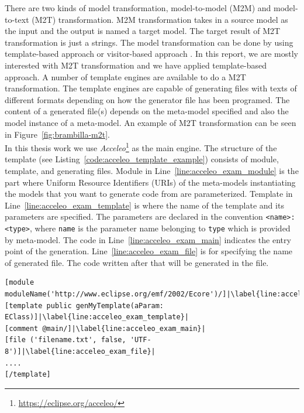 There are two kinds of model transformation, model-to-model (M2M) and model-to-text (M2T) transformation. M2M transformation takes in a source model as the input and the output is named a target model. The target result of M2T transformation is just a strings. The model transformation can be done by using  template-based approach or visitor-based approach \cite{Czarnecki}. In this report, we are mostly interested with M2T transformation and we have applied template-based approach. A number of template engines are available to do a M2T transformation. The template engines are capable of generating files with texts of different formats depending on how the generator file has been programed. The content of a generated file(s) depends on the meta-model specified and also the model instance of a meta-model. An example of M2T transformation can be seen in Figure~\ref{fig:brambilla-m2t}. \\

In this thesis work we use \textit{Acceleo}\footnote{\url{https://eclipse.org/acceleo/}} as the main engine. The structure of the template (see Listing~\ref{code:acceleo_template_example}) consists of module, template, and generating files. Module in Line~\ref{line:acceleo_exam_module} is the part where Uniform Resource Identifiers (URIs) of the meta-models instantiating the models that you want to generate code from are parameterized. Template in Line~\ref{line:acceleo_exam_template} is where the name of the template and its parameters are specified. The parameters are declared in the convention \texttt{<name>:<type>}, where \texttt{name} is the parameter name belonging to \texttt{type} which is provided by meta-model. The code in Line~\ref{line:acceleo_exam_main} indicates the entry point of the generation. Line~\ref{line:acceleo_exam_file} is for specifying the name of generated file. The code written after that will be generated in the file. 

\begin{lstlisting}[escapechar=|,caption=An example of Acceleo template, label=code:acceleo_template_example]
[module moduleName('http://www.eclipse.org/emf/2002/Ecore')/]|\label{line:acceleo_exam_module}|
[template public genMyTemplate(aParam: EClass)]|\label{line:acceleo_exam_template}|
[comment @main/]|\label{line:acceleo_exam_main}|
[file ('filename.txt', false, 'UTF-8')]|\label{line:acceleo_exam_file}|
....
[/template]
\end{lstlisting}


